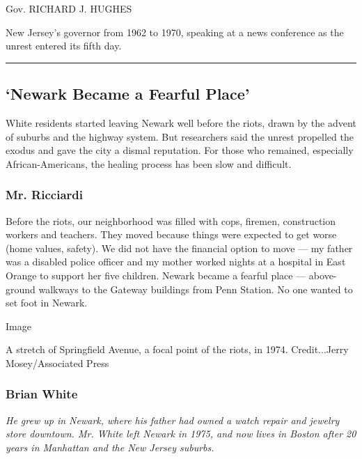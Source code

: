 Gov. RICHARD J. HUGHES

New Jersey's governor from 1962 to 1970, speaking at a news conference
as the unrest entered its fifth day.

\begin{center}\rule{0.5\linewidth}{\linethickness}\end{center}

\hypertarget{newark-became-a-fearful-place}{%
\subsection{`Newark Became a Fearful
Place'}\label{newark-became-a-fearful-place}}

White residents started leaving Newark well before the riots, drawn by
the advent of suburbs and the highway system. But researchers said the
unrest propelled the exodus and gave the city a dismal reputation. For
those who remained, especially African-Americans, the healing process
has been slow and difficult.

\hypertarget{mr-ricciardi}{%
\subsubsection{Mr. Ricciardi}\label{mr-ricciardi}}

Before the riots, our neighborhood was filled with cops, firemen,
construction workers and teachers. They moved because things were
expected to get worse (home values, safety). We did not have the
financial option to move --- my father was a disabled police officer and
my mother worked nights at a hospital in East Orange to support her five
children. Newark became a fearful place --- above-ground walkways to the
Gateway buildings from Penn Station. No one wanted to set foot in
Newark.

Image

A stretch of Springfield Avenue, a focal point of the riots, in 1974.
Credit...Jerry Mosey/Associated Press

\hypertarget{brian-white}{%
\subsubsection{Brian White}\label{brian-white}}

\emph{He grew up in Newark, where his father had owned a watch repair
and jewelry store downtown. Mr. White left Newark in 1975, and now lives
in Boston after 20 years in Manhattan and the New Jersey suburbs. }

